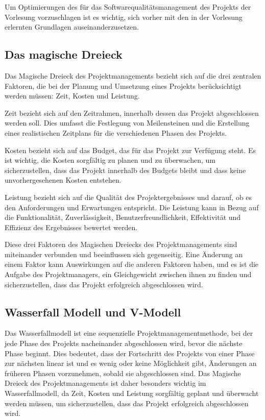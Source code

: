 Um Optimierungen des für das Softwarequalitätsmanagement des Projekts der Vorlesung vorzuschlagen ist es wichtig, sich vorher mit den in der Vorlesung erlernten Grundlagen auseinanderzusetzen.

\subsection{Das magische Dreieck}

Das Magische Dreieck des Projektmanagements bezieht sich auf die drei zentralen Faktoren, die bei der Planung und Umsetzung eines Projekts berücksichtigt werden müssen: Zeit, Kosten und Leistung.

Zeit bezieht sich auf den Zeitrahmen, innerhalb dessen das Projekt abgeschlossen werden soll. Dies umfasst die Festlegung von Meilensteinen und die Erstellung eines realistischen Zeitplans für die verschiedenen Phasen des Projekts.

Kosten bezieht sich auf das Budget, das für das Projekt zur Verfügung steht. Es ist wichtig, die Kosten sorgfältig zu planen und zu überwachen, um sicherzustellen, dass das Projekt innerhalb des Budgets bleibt und dass keine unvorhergesehenen Kosten entstehen.

Leistung bezieht sich auf die Qualität des Projektergebnisses und darauf, ob es den Anforderungen und Erwartungen entspricht. Die Leistung kann in Bezug auf die Funktionalität, Zuverlässigkeit, Benutzerfreundlichkeit, Effektivität und Effizienz des Ergebnisses bewertet werden.

Diese drei Faktoren des Magischen Dreiecks des Projektmanagements sind miteinander verbunden und beeinflussen sich gegenseitig. Eine Änderung an einem Faktor kann Auswirkungen auf die anderen Faktoren haben, und es ist die Aufgabe des Projektmanagers, ein Gleichgewicht zwischen ihnen zu finden und sicherzustellen, dass das Projekt erfolgreich abgeschlossen wird.

\subsection{Wasserfall Modell und V-Modell}

Das Wasserfallmodell ist eine sequenzielle Projektmanagementmethode, bei der jede Phase des Projekts nacheinander abgeschlossen wird, bevor die nächste Phase beginnt. Dies bedeutet, dass der Fortschritt des Projekts von einer Phase zur nächsten linear ist und es wenig oder keine Möglichkeit gibt, Änderungen an früheren Phasen vorzunehmen, sobald sie abgeschlossen sind. Das Magische Dreieck des Projektmanagements ist daher besonders wichtig im Wasserfallmodell, da Zeit, Kosten und Leistung sorgfältig geplant und überwacht werden müssen, um sicherzustellen, dass das Projekt erfolgreich abgeschlossen wird.

